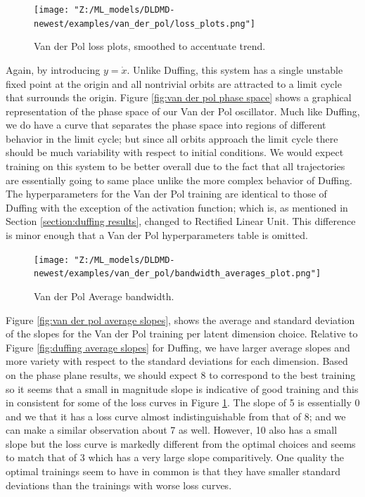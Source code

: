 \begin{figure}[ht]
    \centering
    \begin{minipage}{\textwidth}
        \texttt{[image: "Z:/ML\_models/DLDMD-newest/examples/van\_der\_pol/loss\_plots.png"]} 
    \end{minipage}
    \caption{Van der Pol loss plots, smoothed to accentuate trend.}
    \label{fig:van der pol losses}
\end{figure}

Again, by introducing $y = \dot{x}$. Unlike Duffing, this system has a single unstable fixed point
at the origin and all nontrivial orbits are attracted to a limit cycle that surrounds the origin. 
Figure \ref{fig:van der pol phase space} shows a graphical representation of the phase space of our 
Van der Pol oscillator. Much like Duffing, we do have a curve that separates the phase space into 
regions of different behavior in the limit cycle; but since all orbits approach the limit cycle there
should be much variability with respect to initial conditions. We would expect training on this system 
to be better overall due to the fact that all trajectories are essentially going to same place unlike
the more complex behavior of Duffing. The hyperparameters for the Van der Pol
training are identical to those of Duffing with the exception of the activation function; which is, 
as mentioned in Section \ref{section:duffing results}, changed to Rectified Linear Unit. This difference 
is minor enough that a Van der Pol hyperparameters table is omitted.

\begin{figure}[ht]
    \centering
    \begin{minipage}{\textwidth}
        \texttt{[image: "Z:/ML\_models/DLDMD-newest/examples/van\_der\_pol/bandwidth\_averages\_plot.png"]} 
    \end{minipage} 
    \caption{Van der Pol Average bandwidth.}
\end{figure}

Figure \ref{fig:van der pol average slopes}, shows the average and standard deviation of the slopes for 
the Van der Pol training per latent dimension choice. Relative to Figure \ref{fig:duffing average slopes}
for Duffing, we have larger average slopes and more variety with respect to the standard deviations for 
each dimension. Based on the phase plane results, we should expect 8 to correspond to the best training 
so it seems that a small in magnitude slope is indicative of good training and this in consistent for
some of the loss curves in Figure \ref{fig:van der pol losses}. The slope of 5 is essentially 0 and 
we that it has a loss curve almost indistinguishable from that of 8; and we can make a similar observation
about 7 as well. However, 10 also has a small slope but the loss curve is markedly different from the 
optimal choices and seems to match that of 3 which has a very large slope comparitively. One quality
the optimal trainings seem to have in common is that they have smaller standard deviations than the 
trainings with worse loss curves.

